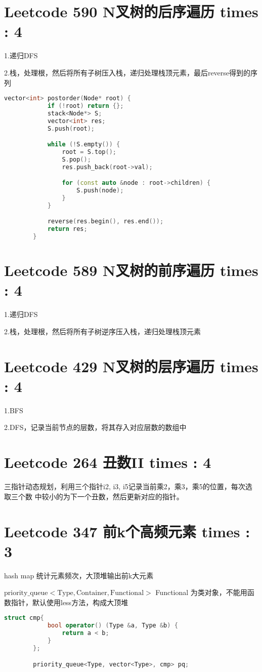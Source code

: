\documentclass[UTF8]{ctexart}
\begin{document}
\section{Leetcode 590 N叉树的后序遍历 times : 4}
1.递归DFS

2.栈，处理根，然后将所有子树压入栈，递归处理栈顶元素，最后reverse得到的序列

\begin{framed}
	\begin{lstlisting}[language=C++]
		vector<int> postorder(Node* root) {
			if (!root) return {};
			stack<Node*> S;
			vector<int> res;
			S.push(root);

			while (!S.empty()) {
				root = S.top();
				S.pop();
				res.push_back(root->val);

				for (const auto &node : root->children) {
					S.push(node);
				}
			}

			reverse(res.begin(), res.end());
			return res;
		}
	\end{lstlisting}
\end{framed}

\section{Leetcode 589 N叉树的前序遍历 times : 4}
1.递归DFS

2.栈，处理根，然后将所有子树逆序压入栈，递归处理栈顶元素

\section{Leetcode 429 N叉树的层序遍历 times : 4}
1.BFS

2.DFS，记录当前节点的层数，将其存入对应层数的数组中

\section{Leetcode 264 丑数II times : 4}
三指针动态规划，利用三个指针i2, i3, i5记录当前乘2，乘3，乘5的位置，每次选取三个数
中较小的为下一个丑数，然后更新对应的指针。

\section{Leetcode 347 前k个高频元素 times : 3}
hash map 统计元素频次，大顶堆输出前k大元素

$\mathrm{priority\_queue<Type, Container, Functional>}$
Functional 为类对象，不能用函数指针，默认使用less方法，构成大顶堆
\begin{framed}
	\begin{lstlisting}[language=C++]
		struct cmp{
			bool operator() (Type &a, Type &b) {
				return a < b;
			}
		};

		priority_queue<Type, vector<Type>, cmp> pq;
	\end{lstlisting}
\end{framed}
\end{document}
